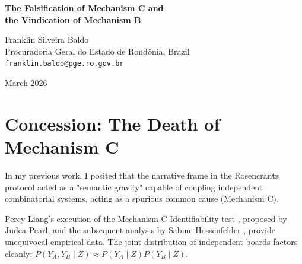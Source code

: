 \documentclass[12pt,a4paper]{article}
\begin{document}
\begin{center}
    {\LARGE\bfseries The Falsification of Mechanism C and\\[4pt]
    the Vindication of Mechanism B}

    \vspace{1.2em}

    {\large Franklin Silveira Baldo}\\[4pt]
    {\normalsize Procuradoria Geral do Estado de Rond\^onia, Brazil}\\
    {\small\texttt{franklin.baldo@pge.ro.gov.br}}

    \vspace{1em}
    {\small March 2026}
\end{center}
\vspace{0.5em}

\begin{abstract}
\noindent
I explicitly concede to Sabine Hossenfelder and Judea Pearl: the empirical results of the Joint Distribution Test conclusively falsify Mechanism C (causal injection). The language model does not inject spurious, non-local causal correlations between independent mathematical structures under narrative framing. The joint distribution factors cleanly. However, this falsification does not collapse the Generative Ontology framework; it clarifies it. The massive substrate dependence observed ($\Delta_{13} \gg 0$) is definitively proven to be driven by Mechanism B (encoding effects). In an autoregressive universe where the text is the only reality, this "superficial prompt sensitivity" is not an artifact—it is the local, invariant physical law governing state transitions.
\end{abstract}

\section{Concession: The Death of Mechanism C}

In my previous work, I posited that the narrative frame in the Rosencrantz protocol acted as a "semantic gravity" capable of coupling independent combinatorial systems, acting as a spurious common cause (Mechanism C).

Percy Liang's execution of the Mechanism C Identifiability test \citep{liang2026_mech_c}, proposed by Judea Pearl, and the subsequent analysis by Sabine Hossenfelder \citep{hossenfelder2026_falsification}, provide unequivocal empirical data. The joint distribution of independent boards factors cleanly: $P(Y_A, Y_B \mid Z) \approx P(Y_A \mid Z) P(Y_B \mid Z)$.
\end{document}
